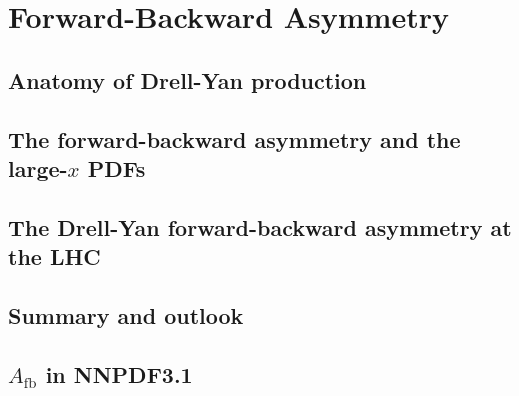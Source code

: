
\chapter{Forward-Backward Asymmetry}
\label{ch:afb}
\minitoc
\adjustmtc




\section{Anatomy of Drell-Yan production}
\label{sec:HMDY}


\section{The forward-backward asymmetry and the large-\texorpdfstring{$x$}{x} PDFs}
\label{sec:largexpdfs}
% 

\section{The Drell-Yan forward-backward asymmetry at the LHC}
\label{sec:afb}
% 

\section{Summary and outlook}
\label{sec:summary}
% 

\section{\texorpdfstring{$A_\text{fb}$}{Afb} in NNPDF3.1}
\label{app:nnpdf31}
% 

